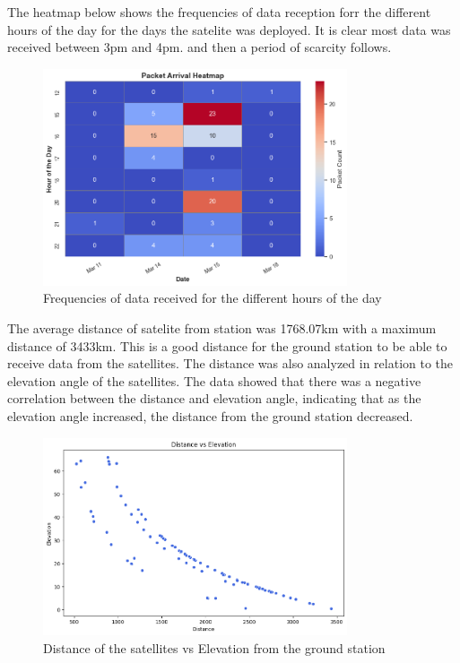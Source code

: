 \documentclass[12pt,a4paper]{article}
\begin{document}
The heatmap below shows the frequencies of data reception forr the different hours of the day for the days the satelite was deployed. It is clear most data was received between 3pm and 4pm. and then a period of scarcity follows.
\begin{figure}[H]
    \centering
    \includegraphics[width=0.8\textwidth]{../images/heatmap.png}
    \caption{Frequencies of data received for the different hours of the day}
    \label{fig:frequencies_data}
\end{figure}

The average distance of satelite from station was 1768.07km with a maximum distance of 3433km. This is a good distance for the ground station to be able to receive data from the satellites. The distance was also analyzed in relation to the elevation angle of the satellites. The data showed that there was a negative correlation between the distance and elevation angle, indicating that as the elevation angle increased, the distance from the ground station decreased.

\begin{figure}[H]
    \centering
    \includegraphics[width=0.8\textwidth]{../images/corr.png}
    \caption{Distance of the satellites vs Elevation from the ground station}
    \label{fig:distance_data}
\end{figure}
\end{document}

